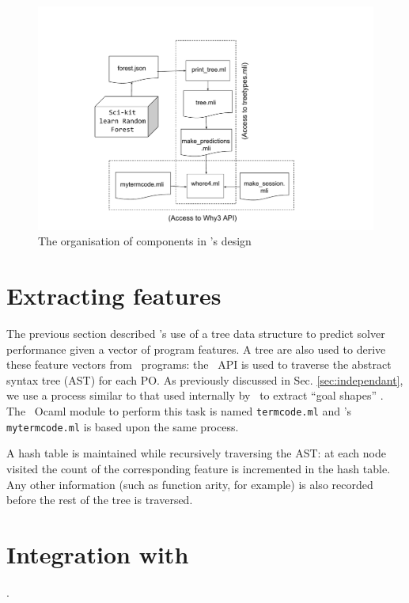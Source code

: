 \begin{figure}
	\centering
	\includegraphics[width=1.1\linewidth]{Figures/Chapter5}
	\caption[\where~modules]{The organisation of components in \where's design}
	\label{fig:Chapter5}
\end{figure}

\section{Extracting features}

The previous section described \where's use of a tree data structure to predict solver performance given a vector of program features.
A tree are also used to derive these feature vectors from \why~programs: the \why~API is used to traverse the abstract syntax tree (AST) for each PO.
As previously discussed in Sec. \ref{sec:independant}, we use a process similar to that used internally by \why~to extract ``goal shapes'' \cite{why:preserving}.
The \why~Ocaml module to perform this task is named \texttt{termcode.ml} and \where's \texttt{mytermcode.ml} is based upon the same process.

A hash table is maintained while recursively traversing the AST: at each node visited the count of the corresponding feature is incremented in the hash table. 
Any other information (such as function arity, for example) is also recorded before the rest of the tree is traversed. 

\section{Integration with \why}

\label{sec:why3-integration}.

